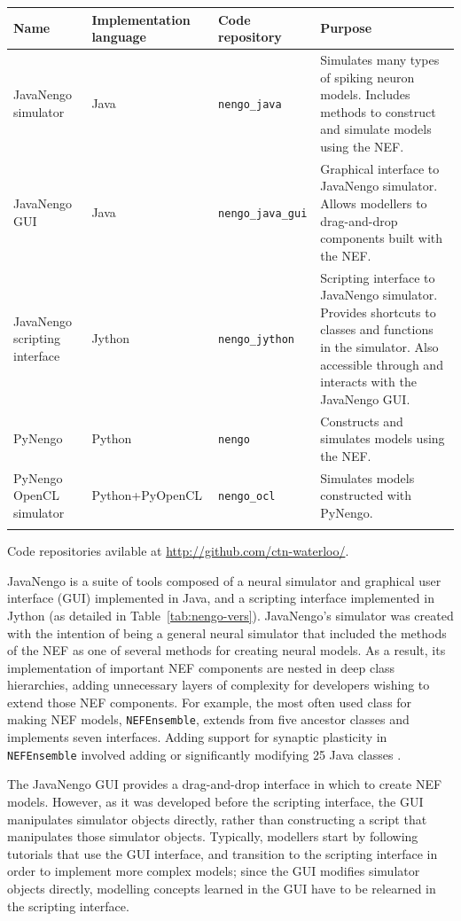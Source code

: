 \documentclass{frontiersSCNS}
\begin{document}
\begin{table}[!t]
{\begin{tabular}{p{2.6cm} p{2.7cm} l p{7cm}} \toprule
\textbf{Name} & \textbf{Implementation language}
  & \textbf{Code repository} & \textbf{Purpose} \\\midrule
JavaNengo simulator & Java & \texttt{nengo\_java}
  & Simulates many types of spiking neuron models.
  Includes methods to construct and simulate models using the NEF. \\
JavaNengo GUI & Java & \texttt{nengo\_java\_gui}
  & Graphical interface to JavaNengo simulator.
  Allows modellers to drag-and-drop components built with the NEF. \\
JavaNengo scripting interface & Jython & \texttt{nengo\_jython}
  & Scripting interface to JavaNengo simulator.
  Provides shortcuts to classes and functions in the simulator.
  Also accessible through and interacts with the JavaNengo GUI. \\
PyNengo & Python & \texttt{nengo}
  & Constructs and simulates models using the NEF. \\
PyNengo OpenCL simulator & Python+PyOpenCL
  & \texttt{nengo\_ocl}
  & Simulates models constructed with PyNengo. \\\botrule
\end{tabular}}{Code repositories avilable at \url{http://github.com/ctn-waterloo/}.}
\end{table}

JavaNengo is a suite of tools composed of
a neural simulator and graphical user interface (GUI)
implemented in Java,
and a scripting interface implemented in Jython
(as detailed in Table~\ref{tab:nengo-vers}).
JavaNengo's simulator was created
with the intention of being a general
neural simulator that included
the methods of the NEF
as one of several
methods for creating neural models.
As a result, its implementation
of important NEF components
are nested in deep class hierarchies,
adding unnecessary layers of complexity
for developers wishing
to extend those NEF components.
For example,
the most often used class for making
NEF models, \texttt{NEFEnsemble},
extends from five ancestor classes
and implements seven interfaces.
Adding support for synaptic plasticity
in \texttt{NEFEnsemble}
involved adding or significantly modifying
25 Java classes \citep{bekolay2010}.

The JavaNengo GUI provides
a drag-and-drop interface in which to create NEF models.
However, as it was developed
before the scripting interface,
the GUI manipulates simulator objects directly,
rather than constructing a script
that manipulates those simulator objects.
Typically, modellers start by following
tutorials that use the GUI interface,
and transition to the scripting interface
in order to implement more complex models;
since the GUI modifies simulator objects directly,
modelling concepts learned in the GUI
have to be relearned in the scripting interface.
\end{document}
